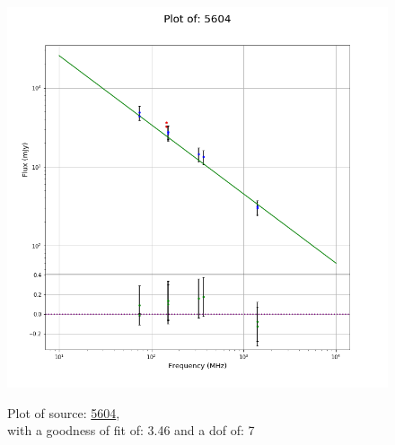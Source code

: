 \documentclass{article}
\begin{document}
\begin{figure}[H]
    \centering
    \begin{minipage}{.5\textwidth}
        \centering
        \includegraphics[scale = 0.35]{KmeulenSimSource_1hr/1hr5604.png}
        \captionsetup{labelformat=empty}
        \caption{Plot of source: \href{http://banana.transientskp.org/r4/vlo_KmeulenSimSource/runningcatalog/5604}{5604},\\with a goodness of fit of: 3.46 and a dof of: 7}
        \addtocounter{figure}{-1}
        \label{KmeulenSimSource:1hr:5604:plot}
    \end{minipage}%
    \begin{minipage}{0.5\textwidth}
        \centering


\end{minipage}
\end{figure}
\end{document}
